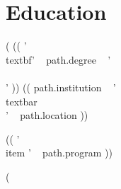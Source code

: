 \documentclass[a4paper,10pt]{article}
\begin{document}
\section*{Education}
(%
    (( '\\textbf{' ~ path.degree ~ '} \\\\' ))
    (( path.institution ~ ' \\textbar\\ ' ~ path.location ))
\begin{itemize}[itemsep=0em]
    (( '\\item ' ~ path.program ))
\end{itemize}
(%
\end{document}
